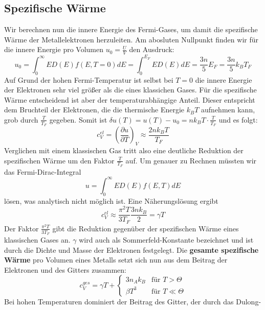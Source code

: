 \documentclass[11pt]{article}
\begin{document}
\subsection{Spezifische Wärme}
Wir berechnen nun die innere Energie des Fermi-Gases, um damit die spezifische
Wärme der Metallelektronen herzuleiten. Am abosluten Nullpunkt finden wir für
die innere Energie pro Volumen $u_0=\frac{U}{V}$ den Ausdruck:
\begin{equation}
  u_0=\int_0^\infty ED(E)f(E,T=0)dE=\int_0^{E_F}ED(E)dE=\frac{3n}{5}E_F=
  \frac{3n}{5}k_BT_F
\end{equation}
Auf Grund der hohen Fermi-Temperatur ist selbst bei $T=0$ die innere Energie der
Elektronen sehr viel größer als die eines klassichen Gases. Für die spezifische
Wärme entscheidend ist aber der temperaturabhängige Anteil. Dieser entspricht
dem Bruchteil der Elektronen, die die thermische Energie $k_BT$ aufnehmen kann,
grob durch $\frac{T}{T_F}$ gegeben. Somit ist $\delta u(T)=u(T)-u_0=nk_BT\cdot
\frac{T}{T_F}$ und es folgt:
\begin{equation}
  c_V^{el}=\left(\frac{\partial u}{\partial T}\right)_V\approx\frac{2nk_BT}{T_F}
\end{equation}
Verglichen mit einem klassischen Gas tritt also eine deutliche Reduktion der
spezifischen Wärme um den Faktor $\frac{T}{T_F}$ auf. Um genauer zu Rechnen
müssten wir das Fermi-Dirac-Integral
\begin{equation}
  u=\int_0^\infty ED(E)f(E,T)dE
\end{equation}
lösen, was analytisch nicht möglich ist. Eine Näherungslösung ergibt
\begin{equation}
  c_V^{el}\approx\frac{\pi^2T}{3T_F}\frac{3nk_B}{2}=\gamma T
\end{equation}
Der Faktor $\frac{\pi^2T}{3T_F}$ gibt die Reduktion gegenüber der spezifischen
Wärme eines klassischen Gases an. $\gamma$ wird auch als Sommerfeld-Konstante
bezeichnet und ist durch die Dichte und Masse der Elektronen festgelegt. Die
\textbf{gesamte spezifische Wärme} pro Volumen eines Metalls setzt sich nun aus
dem Beitrag der Elektronen und des Gitters zusammen:
\begin{equation}
  c_V^{ges}=\gamma T + \begin{cases}
  3n_Ak_B & \text{für } T>\Theta \\
  \beta T^3 & \text{für } T\ll\Theta
  \end{cases}
\end{equation}
Bei hohen Temperaturen dominiert der Beitrag des Gitter, der durch das Dulong-
\end{document}
